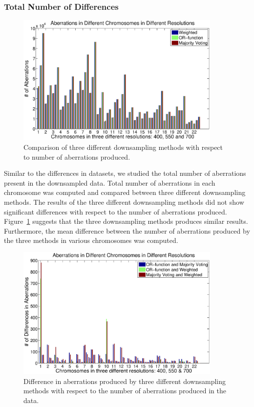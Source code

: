 \subsubsection{Total Number of Differences}
\label{ss:totaldifferences}

\begin{figure}[h!]
\centering
\includegraphics[width=0.9\textwidth]{figures/abrdiffres1}
\caption[Number of aberrations produced]{Comparison of three different downsampling methods with respect to number of aberrations produced.}\label{Fig:total1hist}
\end{figure}

Similar to the differences in datasets, we studied the total number of aberrations present in the downsampled data. Total number of aberrations in each chromosome was computed and compared between three different downsampling methods. The results of the three different downsampling methods did not show significant differences with respect to the number of aberrations produced. Figure~\ref{Fig:total1hist} suggests that the three downsampling methods produces similar results. Furthermore, the mean difference between the number of aberrations produced by the three methods in various chromosomes was computed.

\begin{figure}[h!]
\centering
\includegraphics[width=0.9\textwidth]{figures/diffaberrations1}
\caption[Mean differences in the aberrations produced]{Difference in aberrations produced by three different downsampling methods with respect to the number of aberrations produced in the data.} \label{Fig:total1diff}
\end{figure}


